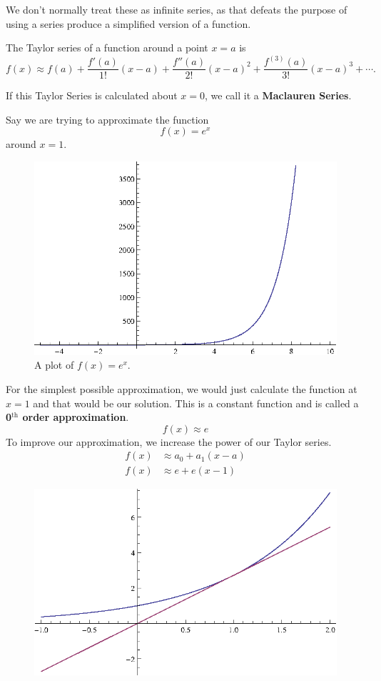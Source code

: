 We don't normally treat these as infinite series, as that defeats the purpose of using a series produce a simplified version of a function.

\begin{theorem}
  The Taylor series of a function around a point $x=a$ is
  \[ f(x) \approx f(a) + \frac{f'(a)}{1!}(x-a) + \frac{f''(a)}{2!}(x-a)^2+\frac{f^{(3)}(a)}{3!}(x-a)^3+\cdots . \]
  \label{th:taylorseries}
\end{theorem}
If this Taylor Series is calculated about $x=0$, we call it a \textbf{Maclauren Series}.
\begin{ex}
   Say we are trying to approximate the function
  \[ f(x) =  e^x \]
  around $x=1$.
  \begin{figure}[H]
    \begin{center}
      \includegraphics{continuous/series/etx}
    \end{center}
    \caption{A plot of $f(x)=e^x$.}
  \end{figure}
  For the simplest possible approximation, we would just calculate the function at $x=1$ and that would be our solution.
  This is a constant function and is called a \textbf{0$^\textrm{th}$ order approximation}.
  \[f(x) \approx e \]
  To improve our approximation, we increase the power of our Taylor series.
  \begin{align*}
    f(x) &\approx a_0 + a_1 (x-a)\\
    f(x) &\approx e + e (x-1)
  \end{align*}
  \begin{figure}[H]
    \begin{center}
      \includegraphics{continuous/series/1storder}

\end{center}
\end{figure}
\end{ex}
